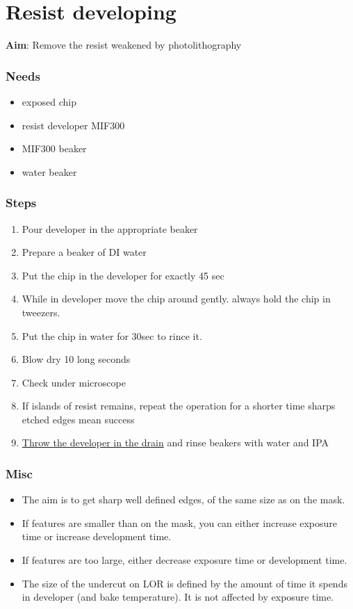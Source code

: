 \section{Resist developing}

\textbf{Aim}:
Remove the resist weakened by photolithography

\subsubsection{Needs}
\begin{itemize}[noitemsep]
\item exposed chip
\item resist developer MIF300
\item MIF300 beaker
\item water beaker
\end{itemize}

\subsubsection{Steps}
\begin{enumerate}
\item Pour developer in the appropriate beaker
\item Prepare a beaker of DI water
\item Put the chip in the developer for exactly 45 sec
\item While in developer move the chip around gently. always hold the chip in tweezers.
\item Put the chip in water for 30sec to rince it.
\item Blow dry 10 long seconds
\item Check under microscope
\item If islands of resist remains, repeat the operation for a shorter time
sharps etched edges mean success
\item \underline{Throw the developer in the drain} and rinse beakers with water and IPA
\end{enumerate}

\subsubsection{Misc}
\begin{itemize}
  \item The aim is to get sharp well defined edges, of the same size as on the mask.
  \item If features are smaller than on the mask, you can either increase exposure time or increase development time.
  \item If features are too large, either decrease exposure time or development time.
  \item The size of the undercut on LOR is defined by the amount of time it spends in developer (and bake temperature).
  It is not affected by exposure time.
\end{itemize}
\newpage

